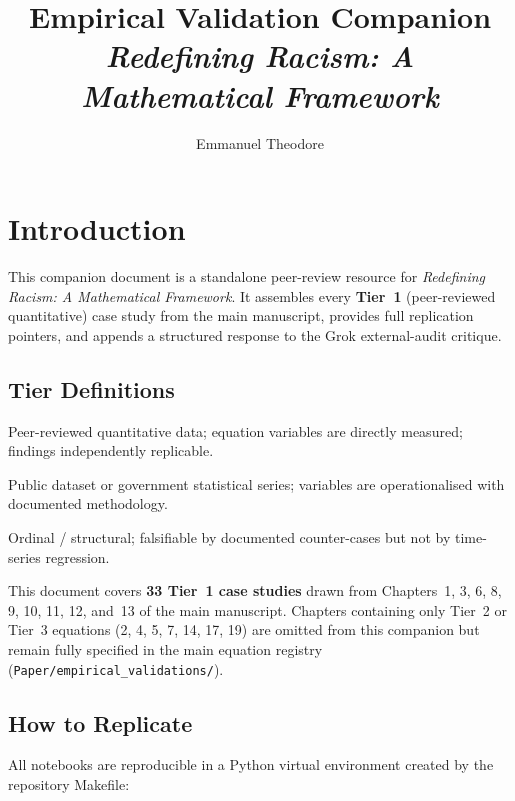 \documentclass[12pt]{article}
\title{%
  \textbf{Empirical Validation Companion}\\[6pt]
  {\large\textit{Redefining Racism: A Mathematical Framework}}%
}
\author{Emmanuel Theodore}
\date{}
\newcommand{\TierOne}{\textcolor{green!60!black}{\textbf{T1}}}
\newcommand{\TierTwo}{\textcolor{blue!70!black}{\textbf{T2}}}
\newcommand{\TierThree}{\textcolor{gray}{\textbf{T3}}}
\begin{document}
\maketitle
\tableofcontents
\clearpage

\section{Introduction}

This companion document is a standalone peer-review resource for
\textit{Redefining Racism: A Mathematical Framework}.  It assembles
every \textbf{Tier~1} (peer-reviewed quantitative) case study from the
main manuscript, provides full replication pointers, and appends a
structured response to the Grok external-audit critique.

\subsection*{Tier Definitions}
\begin{description}[leftmargin=2cm, style=nextline]
  \item[\TierOne\enspace Tier~1] Peer-reviewed quantitative data; equation
    variables are directly measured; findings independently replicable.
  \item[\TierTwo\enspace Tier~2] Public dataset or government statistical
    series; variables are operationalised with documented methodology.
  \item[\TierThree\enspace Tier~3] Ordinal / structural; falsifiable by
    documented counter-cases but not by time-series regression.
\end{description}

This document covers \textbf{33 Tier~1 case studies} drawn from
Chapters~1, 3, 6, 8, 9, 10, 11, 12, and~13 of the main manuscript.
Chapters containing only Tier~2 or Tier~3 equations (2, 4, 5, 7, 14,
17, 19) are omitted from this companion but remain fully specified in
the main equation registry (\texttt{Paper/empirical\_validations/}).

\subsection*{How to Replicate}

All notebooks are reproducible in a Python virtual environment created
by the repository Makefile:
\end{document}
